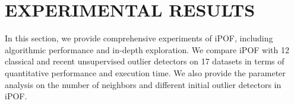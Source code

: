 \documentclass[sigconf,nonacm]{acmart}
\begin{document}











\section{EXPERIMENTAL RESULTS}\label{sec:experiment}
In this section, we provide comprehensive experiments of iPOF, including algorithmic performance and in-depth exploration. We compare iPOF with 12 classical and recent unsupervised outlier detectors on 17 datasets in terms of quantitative performance and execution time. We also provide the parameter analysis on the number of neighbors and different initial outlier detectors in iPOF.
\end{document}
